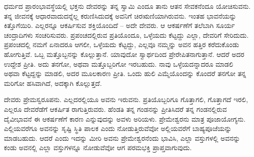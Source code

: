 ಧರ್ಮದ ಪ್ರಾರಂಭಾವಸ್ಥೆಯಲ್ಲಿ ಭಕ್ತನು ದೇವರನ್ನು ತನ್ನ ಸ್ವಾಮಿ ಎಂದೂ ತಾನು ಆತನ ಸೇವಕನೆಂದೂ ಯೋಚಿಸುವನು. ತನ್ನ ಜೀವನಕ್ಕೆ ಆಧಾರವಾದುದನ್ನೆಲ್ಲ ಕರುಣಿಸಿದುದಕ್ಕೆ ಅವನಿಗೆ ಚಿರಋಣಿಯಾಗಿರುವನು. ಇಂತಹ ಭಾವನೆಯನ್ನು ಕಿತ್ತೊಗೆಯಿರಿ. ಎಲ್ಲರನ್ನೂ ಆಕರ್ಷಿಸುವ ಶಕ್ತಿಯೊಂದಿದೆ – ಅದೇ ದೇವರು. ಆ ಆಕರ್ಷಣೆಗೆ ತಲೆಬಾಗಿ ಸೂರ್ಯ ಚಂದ್ರಾದಿಗಳು ಸಂಚರಿಸುವರು. ಪ್ರಪಂಚದಲ್ಲಿರುವ ಪ್ರತಿಯೊಂದೂ, ಒಳ್ಳೆಯದು ಕೆಟ್ಟದ್ದು ಎಲ್ಲಾ, ದೇವರಿಗೆ ಸೇರಿದುದು. ಪ್ರಪಂಚದಲ್ಲಿ ನಮಗೆ ಏನಾದರೂ ಆಗಲೀ, ಒಳ್ಳೆಯದು ಕೆಟ್ಟದ್ದು, ಎಲ್ಲವೂ ನಮ್ಮನ್ನು ಅವನ ಹತ್ತಿರ ಕರೆದುಕೊಂಡು ಹೋಗುತ್ತಿವೆ. ಒಬ್ಬ ಮತ್ತೊಬ್ಬನನ್ನು ಕೊಲ್ಲುತ್ತಾನೆ. ಯಾವುದೋ ಸ್ವಾರ್ಥದಿಂದ ಪ್ರೇರೇಪಿತನಾಗುತ್ತಾನೆ. ಆದರೆ ಅದರ ಉದ್ದೇಶ ಪ್ರೀತಿ. ಅದು ತನಗೋ, ಅಥವಾ ಮತ್ತೊಬ್ಬರಿಗೋ ಇರಬಹುದು. ನಾವು ಒಳ್ಳೆಯದನ್ನಾದರೂ ಮಾಡಲಿ ಅಥವಾ ಕೆಟ್ಟದ್ದನ್ನು ಮಾಡಲಿ, ಅದರ ಮೂಲಕಾರಣ ಪ್ರೀತಿ. ಒಂದು ಹುಲಿ ಎಮ್ಮೆಯೊಂದನ್ನು ಕೊಂದರೆ ತನಗೋ ತನ್ನ ಮರಿಗೋ ಹಸಿವಾಗಿದೆ, ಅದಕ್ಕಾಗಿ ಕೊಲ್ಲುತ್ತದೆ.

ದೇವರು ಪ್ರೇಮಸ್ವರೂಪನು. ಎಲ್ಲದರಲ್ಲಿಯೂ ಅವನು ಇರುವನು. ಪ್ರತಿಯೊಬ್ಬರಿಗೂ ಗೊತ್ತಾಗಲಿ, ಗೊತ್ತಾಗದೆ ಇರಲಿ, ಎಲ್ಲರೂ ದೇವರೆಡೆಗೆ ಆಕರ್ಷಿತ ರಾಗುತ್ತಿರುವರು. ಹೆಂಡತಿ ತನ್ನ ಗಂಡನನ್ನು ಪ್ರೀತಿಸಿದರೆ ತನ್ನ ಗಂಡನಲ್ಲಿರುವ ದೈವೀಭಾವನೆ ಈ ಆಕರ್ಷಣೆಗೆ ಕಾರಣ ಎನ್ನುವುದನ್ನು ಅವಳು ಅರಿಯಳು. ಪ್ರೇಮೇಶ್ವರನು ಮಾತ್ರ ಪೂಜಾಯೋಗ್ಯನು. ಎಲ್ಲಿಯವರೆಗೂ ಅವನನ್ನು ಸೃಷ್ಟಿ ಸ್ಥಿತಿ ಪಾಲಕ ಎಂದು ನೋಡುತ್ತಿರುವೆವೋ ಅಲ್ಲಿಯವರೆಗೆ ಬಾಹ್ಯಪೂಜೆಯನ್ನು ಮಾಡಬಹುದು. ಆದರೆ ಎಂದು ಇದನ್ನು ಮೀರಿ ಅವನು ಪ್ರೇಮೇಶ್ವರನೆಂದು ಭಾವಿಸಿ, ಎಲ್ಲಾ ವಸ್ತುಗಳಲ್ಲಿ ಅವನನ್ನು ಕಂಡು ಅವನಲ್ಲಿ ಎಲ್ಲಾ ವಸ್ತುಗಳನ್ನೂ ನೋಡುವೆವೋ ಆಗ ಪರಮಭಕ್ತಿ ಪ್ರಾಪ್ತವಾಗುವುದು.

